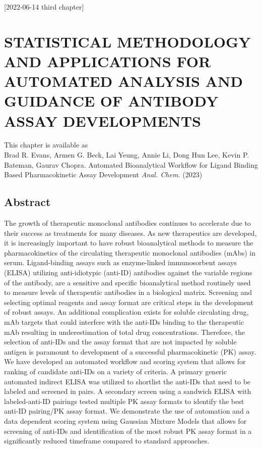 [2022-06-14 third chapter]

\chapter{STATISTICAL METHODOLOGY AND APPLICATIONS FOR AUTOMATED ANALYSIS AND GUIDANCE OF ANTIBODY ASSAY DEVELOPMENTS}

This chapter is available as\\
\indent Brad R. Evans, Armen G. Beck, Lai Yeung, Annie Li, Dong Hun Lee, Kevin P. Bateman, Gaurav Chopra. Automated Bioanalytical Workflow for Ligand Binding Based Pharmacokinetic Assay Development \textit{Anal. Chem.} (2023)
\section{Abstract}
The growth of therapeutic monoclonal antibodies continues to accelerate due to their success as treatments for many diseases.  As new therapeutics are developed, it is increasingly important to have robust bioanalytical methods to measure the pharmacokinetics of the circulating therapeutic monoclonal antibodies (mAbs) in serum.  Ligand-binding assays such as enzyme-linked immunosorbent assays (ELISA) utilizing anti-idiotypic (anti-ID) antibodies against the variable regions of the antibody, are a sensitive and specific bioanalytical method routinely used to measure levels of therapeutic antibodies in a biological matrix.  Screening and selecting optimal reagents and assay format are critical steps in the development of robust assays.  An additional complication exists for soluble circulating drug, mAb targets that could interfere with the anti-IDs binding to the therapeutic mAb resulting in underestimation of total drug concentrations.  Therefore, the selection of anti-IDs and the assay format that are not impacted by soluble antigen is paramount to development of a successful pharmacokinetic (PK) assay.  We have developed an automated workflow and scoring system that allows for ranking of candidate anti-IDs on a variety of criteria.  A primary generic automated indirect ELISA was utilized to shortlist the anti-IDs that need to be labeled and screened in pairs.  A secondary screen using a sandwich ELISA with labeled-anti-ID pairings tested multiple PK assay formats to identify the best anti-ID pairing/PK assay format.  We demonstrate the use of automation and a data dependent scoring system using Gaussian Mixture Models that allows for screening of anti-IDs and identification of the most robust PK assay format in a significantly reduced timeframe compared to standard approaches.

